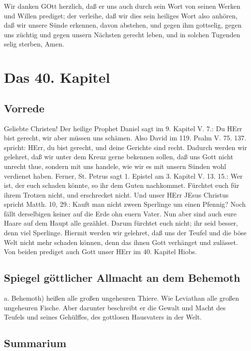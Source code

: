 Wir danken GOtt herzlich, daß er uns auch durch sein Wort von seinen Werken und Willen prediget; der verleihe, daß wir dies sein heiliges Wort also anhören, daß wir unsere Sünde erkennen, davon abstehen, und gegen ihm gottselig, gegen uns züchtig und gegen unsern Nächsten gerecht leben, und in solchen Tugenden selig sterben, Amen.

\chapter{Das 40. Kapitel}

\section{Vorrede}

Geliebte Christen! Der heilige Prophet Daniel sagt im 9. Kapitel V. 7.: Du HErr bist gerecht, wir aber müssen uns schämen. Also David im 119. Psalm V. 75. 137. spricht: HErr, du bist gerecht, und deine Gerichte sind recht. Dadurch werden wir gelehret, daß wir unter dem Kreuz gerne bekennen sollen, daß uns Gott nicht unrecht thue, sondern mit uns handele, wie wir es mit unsern Sünden wohl verdienet haben. Ferner, St. Petrus sagt 1. Epistel am 3. Kapitel V. 13. 15.: Wer ist, der euch schaden könnte, so ihr dem Guten nachkommet. Fürchtet euch für ihrem Trotzen nicht, und erschrecket nicht. Und unser HErr JEsus Christus spricht Matth. 10, 29.: Kauft man nicht zween Sperlinge um einen Pfennig? Noch fällt derselbigen keiner auf die Erde ohn euern Vater. Nun aber sind auch eure Haare auf dem Haupt alle gezählet. Darum fürchtet euch nicht; ihr seid besser, denn viel Sperlinge. Hiermit werden wir gelehret, daß uns der Teufel und die böse Welt nicht mehr schaden können, denn das ihnen Gott verhänget und zulässet. Von beiden prediget auch Gott unser HErr im 40. Kapitel Hiobs.

\section{Spiegel göttlicher Allmacht an dem Behemoth}

a. Behemoth) heißen alle großen ungeheuren Thiere. Wie Leviathan alle großen ungeheuren Fische. Aber darunter beschreibt er die Gewalt und Macht des Teufels und seines Gehülffes, des gottlosen Hausvaters in der Welt.

\section{Summarium}

